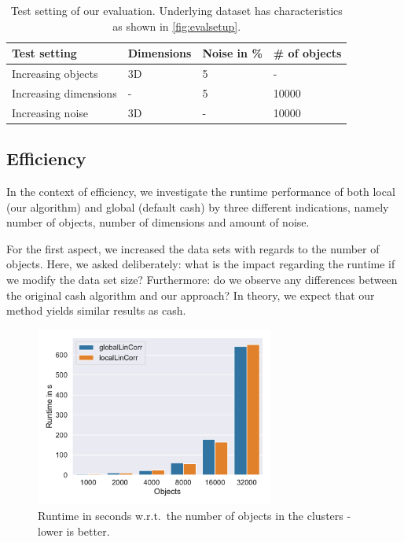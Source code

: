 \begin{table}[hb]
\centering
\begin{tabularx}{\textwidth}{@{}llll@{}}
\toprule
Test setting           & Dimensions & Noise in \% & \# of objects \\ \midrule
Increasing objects    & 3D         & 5           & -             \\
Increasing dimensions & -          & 5           & 10000         \\
Increasing noise      & 3D         & -           & 10000         \\ \bottomrule
\end{tabularx}%
\caption{Test setting of our evaluation. Underlying dataset has characteristics as shown in \autoref{fig:evalsetup}.}
\label{tab:reducedsetup}
\end{table}
 
\subsection{Efficiency}
In the context of efficiency, we investigate the runtime performance of both local (our algorithm) and global (default \gls{cash}) by three different indications, namely number of objects, number of dimensions and amount of noise.

For the first aspect, we increased the data sets with regards to the number of objects. Here, we asked deliberately: what is the impact regarding the runtime if we modify the data set size?
Furthermore: do we observe any differences between the original \gls{cash} algorithm and our approach? In theory, we expect that our method yields similar results as \gls{cash}.


\begin{figure}[h]
    \centering
    \includegraphics[width=0.7\textwidth]{new_evaluation/per_objects/Avg_Runtime_3D_N5_pobjects_bar.pdf}
    \caption{Runtime in seconds w.r.t.\ the number of objects in the clusters - lower is better.}
    \label{fig:eval_per_objects}   
\end{figure}

